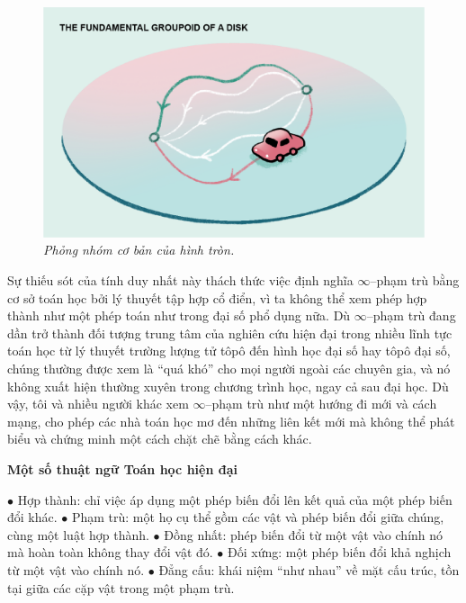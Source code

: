 \begin{multicols}{2}
	\begin{figure}[H]
		\centering
		\vspace*{-5pt}
		\captionsetup{labelformat= empty, justification=centering}
		\includegraphics[width=1\linewidth]{9}
		\caption{\small\textit{\color{duongvaotoanhoc}Phỏng nhóm cơ bản của hình tròn.}}
		\vspace*{-10pt}
	\end{figure}
	Sự thiếu sót của tính duy nhất này thách thức việc định nghĩa $\infty$--phạm trù bằng cơ sở toán học bởi lý thuyết tập hợp cổ điển, vì ta không thể xem phép hợp thành như một phép toán như trong đại số phổ dụng nữa. Dù $\infty$--phạm trù đang dần trở thành đối tượng trung tâm của nghiên cứu hiện đại trong nhiều lĩnh tực toán học từ lý thuyết trường lượng tử tôpô đến hình học đại số hay tôpô đại số, chúng thường được xem là ``quá khó'' cho mọi người ngoài các chuyên gia, và nó không xuất hiện thường xuyên trong chương trình học, ngay cả sau đại học. Dù vậy, tôi và nhiều người khác xem $\infty$--phạm trù như một hướng đi mới và cách mạng, cho phép các nhà toán học mơ đến những liên kết mới mà không thể phát biểu và chứng minh một cách chặt chẽ bằng cách khác.
	\vskip 0.1cm
	\centerline{\bf\color{duongvaotoanhoc}Một số thuật ngữ Toán học hiện đại}
	\vskip 0.1cm
	$\bullet$ Hợp thành: chỉ việc áp dụng một phép biến đổi lên kết quả của một phép biến đổi khác.
	\vskip 0.1cm	
	$\bullet$ Phạm trù: một họ cụ thể gồm các vật và phép biến đổi giữa chúng, cùng một luật hợp thành.
	\vskip 0.1cm	
	$\bullet$ Đồng nhất: phép biến đổi từ một vật vào chính nó mà hoàn toàn không thay đổi vật đó.
	\vskip 0.1cm			
	$\bullet$ Đối xứng: một phép biến đổi khả nghịch từ một vật vào chính nó.
	\vskip 0.1cm	
	$\bullet$ Đẳng cấu: khái niệm ``như nhau'' về mặt cấu trúc, tồn tại giữa các cặp vật trong một phạm trù.

\end{multicols}
